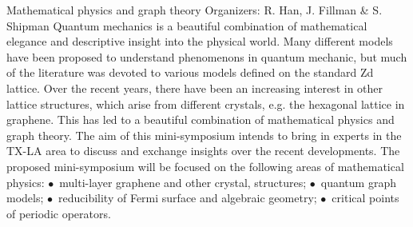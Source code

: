 \label{mini09}

\miniabs
{Mathematical physics and graph theory}
{Organizers: R. Han, J. Fillman \& S. Shipman}
{Quantum mechanics is a beautiful combination of mathematical elegance and descriptive insight into the physical world. Many different models have been proposed to understand phenomenons in quantum mechanic, but much of the literature was devoted to various models defined on the standard Zd lattice. Over the recent years, there have been an increasing interest in other lattice structures, which arise from different crystals, e.g. the hexagonal lattice in graphene. This has led to a beautiful combination of mathematical physics and graph theory. The aim of this mini-symposium intends to bring in experts in the TX-LA area to discuss and exchange insights over the recent developments. The proposed mini-symposium will be focused on the following areas of mathematical physics: $\bullet$~multi-layer graphene and other crystal,  structures; $\bullet$~quantum graph models; $\bullet$~reducibility of Fermi surface and algebraic geometry; $\bullet$~critical points of periodic operators.}

